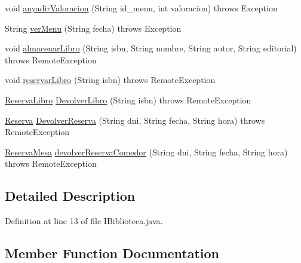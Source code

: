 \begin{DoxyCompactItemize}
\item 
void \mbox{\hyperlink{interfacees_1_1deusto_1_1spq_1_1biblioteca_1_1remote_1_1_i_biblioteca_a72b9d5541556bacfdfb37f47753972c1}{anyadir\+Valoracion}} (String id\+\_\+menu, int valoracion)  throws Exception
\item 
String \mbox{\hyperlink{interfacees_1_1deusto_1_1spq_1_1biblioteca_1_1remote_1_1_i_biblioteca_a7a9df6fad07fe2cfe50c261b5e048365}{ver\+Menu}} (String fecha)  throws Exception
\item 
void \mbox{\hyperlink{interfacees_1_1deusto_1_1spq_1_1biblioteca_1_1remote_1_1_i_biblioteca_a680527b39d6011fe354b9410a204e8cc}{almacenar\+Libro}} (String isbn, String nombre, String autor, String editorial)  throws Remote\+Exception
\item 
void \mbox{\hyperlink{interfacees_1_1deusto_1_1spq_1_1biblioteca_1_1remote_1_1_i_biblioteca_af8c7a0e5361bfac62c0b8804d9112b51}{reservar\+Libro}} (String isbn)  throws Remote\+Exception
\item 
\mbox{\hyperlink{classes_1_1deusto_1_1spq_1_1biblioteca_1_1data_1_1_reserva_libro}{Reserva\+Libro}} \mbox{\hyperlink{interfacees_1_1deusto_1_1spq_1_1biblioteca_1_1remote_1_1_i_biblioteca_aace05bd0eeb7af574d9725203672f5c8}{Devolver\+Libro}} (String isbn)  throws Remote\+Exception
\item 
\mbox{\hyperlink{classes_1_1deusto_1_1spq_1_1biblioteca_1_1data_1_1_reserva}{Reserva}} \mbox{\hyperlink{interfacees_1_1deusto_1_1spq_1_1biblioteca_1_1remote_1_1_i_biblioteca_a988bc8c24da1f11665ea205e2fc9b95e}{Devolver\+Reserva}} (String dni, String fecha, String hora)  throws Remote\+Exception
\item 
\mbox{\hyperlink{classes_1_1deusto_1_1spq_1_1biblioteca_1_1data_1_1_reserva_mesa}{Reserva\+Mesa}} \mbox{\hyperlink{interfacees_1_1deusto_1_1spq_1_1biblioteca_1_1remote_1_1_i_biblioteca_a06da4875e23b3d05c49695f01e1383df}{devolver\+Reserva\+Comedor}} (String dni, String fecha, String hora)  throws Remote\+Exception
\end{DoxyCompactItemize}


\subsection{Detailed Description}


Definition at line 13 of file I\+Biblioteca.\+java.



\subsection{Member Function Documentation}
\mbox{\label{interfacees_1_1deusto_1_1spq_1_1biblioteca_1_1remote_1_1_i_biblioteca_a680527b39d6011fe354b9410a204e8cc}} 
